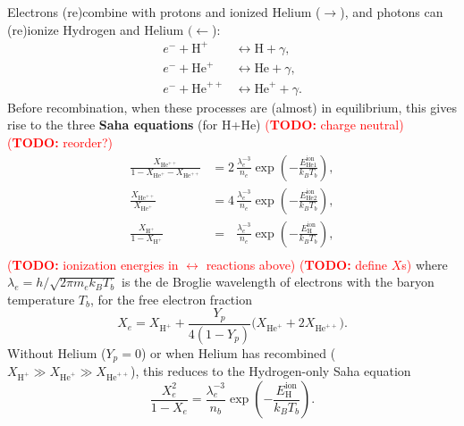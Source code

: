 \documentclass[10pt,a4paper]{article}
\newcommand\TODO[1]{\textcolor{red}{(\textbf{TODO:} #1)}}
\begin{document}
Electrons (re)combine with protons and ionized Helium ($\rightarrow$),
and photons can (re)ionize Hydrogen and Helium $(\leftarrow$):
\begin{subequations}
\begin{align}
	e^- + \text{H}^+ &\leftrightarrow \text{H} + \gamma,\\
	e^- + \text{He}^+ &\leftrightarrow \text{He} + \gamma, \\
	e^- + \text{He}^{++} &\leftrightarrow \text{He}^+ + \gamma.
\end{align}
\label{eq_thomson}
\end{subequations}
Before recombination, when these processes are (almost) in equilibrium,
this gives rise to the three \textbf{Saha equations} (for H+He)
\TODO{charge neutral}
\TODO{reorder?}
\newcommand{\XHp}{X_{\text{H}^+}}
\newcommand{\XHep}{X_{\text{He}^+}}
\newcommand{\XHepp}{X_{\text{He}^{++}}}
\begin{subequations}
\begin{align}
    \frac{\XHepp}{1 - \XHep - \XHepp} &= 2 \, \frac{\lambda_e^{-3}}{n_e} \exp \left(-\frac{E^\text{ion}_\text{He1}}{k_B T_b} \right), \\
    \frac{\XHepp}{\XHep} &= 4 \, \frac{\lambda_e^{-3}}{n_e} \exp\left(-\frac{E^\text{ion}_\text{He2}}{k_B T_b}\right), \\
    \frac{\XHp}{1-\XHp} &= \phantom{1} \, \frac{\lambda_e^{-3}}{n_e} \exp\left(-\frac{E^\text{ion}_\text{H}}{k_B T_b}\right), \\
\end{align}
\label{eq_saha_H_He}
\end{subequations}
\TODO{ionization energies in $\leftrightarrow$ reactions above}
\TODO{define $X$s}
where $\lambda_e = h / \sqrt{2 \pi m_e k_B T_b}$ is the de Broglie wavelength of electrons with the baryon temperature $T_b$,
for the free electron fraction
\begin{equation}
    X_e = \XHp + \frac{Y_p}{4(1-Y_p)} \Big( \XHep + 2 \XHepp \Big) .
\label{eq_Saha_H_He_Xe}
\end{equation}
Without Helium ($Y_p=0$) or when Helium has recombined ($\XHp \gg \XHep \gg \XHepp$),
this reduces to the Hydrogen-only Saha equation
\begin{equation}
	\frac{X_e^2}{1-X_e} = \frac{\lambda_e^{-3}}{n_b} \exp \left( -\frac{E^\text{ion}_\text{H}}{k_B T_b} \right).
\label{eq_saha_H}
\end{equation}
\end{document}
